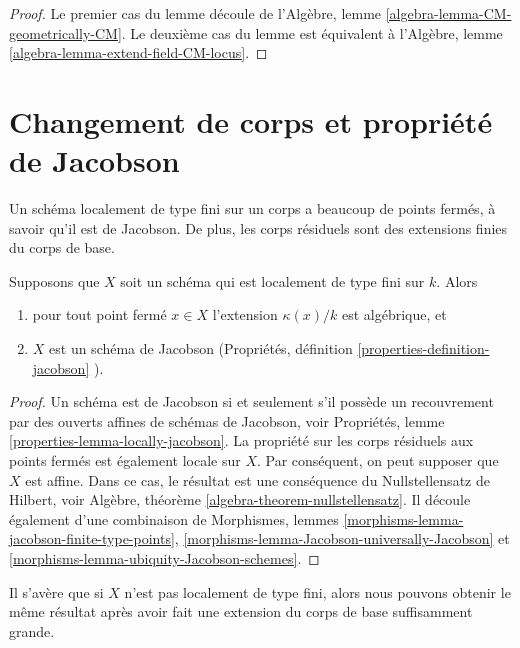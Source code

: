 \begin{proof}
Le premier cas du lemme découle de l'Algèbre,
lemme \ref{algebra-lemma-CM-geometrically-CM}. Le
deuxième cas du lemme est équivalent à l'Algèbre,
lemme \ref{algebra-lemma-extend-field-CM-locus}.
\end{proof}







\section{Changement de corps et propriété de Jacobson}
\label{section-overfield}

\noindent
Un schéma localement de type fini sur un corps a beaucoup
de points fermés, à savoir qu'il est de Jacobson. De plus, les
corps résiduels sont des extensions finies du corps de base.

\begin{lemma}
\label{lemma-locally-finite-type-Jacobson}
Supposons que $X$ soit un schéma qui est
localement de type fini sur $k$. Alors
\begin{enumerate}
\item pour tout point fermé $x \in X$
l'extension $\kappa(x)/k$ est algébrique, et
\item $X$ est un schéma de Jacobson (Propriétés,
définition \ref{properties-definition-jacobson} ).
\end{enumerate}
\end{lemma}

\begin{proof}
Un schéma est de Jacobson si et seulement s'il possède un
recouvrement par des ouverts affines de schémas de Jacobson,
voir Propriétés, lemme
\ref{properties-lemma-locally-jacobson}. La propriété sur les corps
résiduels aux points fermés est également locale sur $X$. Par
conséquent, on peut supposer que $X$ est affine. Dans ce cas,
le résultat est une conséquence du Nullstellensatz de Hilbert, voir
Algèbre, théorème \ref{algebra-theorem-nullstellensatz}. Il découle
également d'une combinaison de Morphismes, lemmes
\ref{morphisms-lemma-jacobson-finite-type-points},
\ref{morphisms-lemma-Jacobson-universally-Jacobson} et \ref{morphisms-lemma-ubiquity-Jacobson-schemes}.
\end{proof}

\noindent
Il s'avère que si $X$ n'est pas localement de type fini, alors nous pouvons obtenir
le même résultat après avoir fait une extension du corps de base suffisamment grande.

